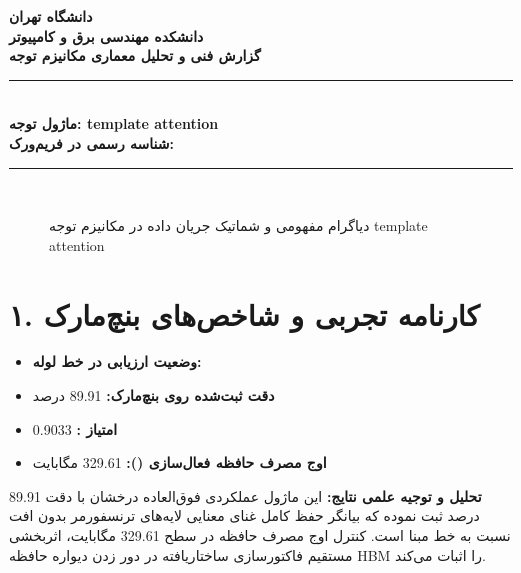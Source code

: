 \documentclass[12pt,a4paper]{article}
\begin{document}
\begin{center}
{\Large\bfseries دانشگاه تهران}\\[0.2cm]
{\large\bfseries دانشکده مهندسی برق و کامپیوتر}\\[0.2cm]
{\large\bfseries گزارش فنی و تحلیل معماری مکانیزم توجه}\\[0.5cm]
\rule{\linewidth}{1pt}\\[0.3cm]
{\LARGE\bfseries ماژول توجه: template attention}\\[0.2cm]
{\large \textbf{شناسه رسمی در فریم‌ورک:} }\\[0.2cm]
\rule{\linewidth}{1pt}\\[0.5cm]
\end{center}

\begin{figure}[H]
\centering
{}
\caption{دیاگرام مفهومی و شماتیک جریان داده در مکانیزم توجه template attention}
\end{figure}

\section*{۱. کارنامه تجربی و شاخص‌های بنچ‌مارک}
\begin{itemize}
\item \textbf{وضعیت ارزیابی در خط لوله:} 
\item \textbf{دقت ثبت‌شده روی بنچ‌مارک:} 89.91 درصد
\item \textbf{امتیاز :} 0.9033
\item \textbf{اوج مصرف حافظه فعال‌سازی ():} 329.61 مگابایت
\end{itemize}
\textbf{تحلیل و توجیه علمی نتایج:} این ماژول عملکردی فوق‌العاده درخشان با دقت 89.91 درصد ثبت نموده که بیانگر حفظ کامل غنای معنایی لایه‌های ترنسفورمر بدون افت نسبت به خط مبنا است. کنترل اوج مصرف حافظه در سطح 329.61 مگابایت، اثربخشی مستقیم فاکتورسازی ساختاریافته در دور زدن دیواره حافظه HBM را اثبات می‌کند.
\end{document}
